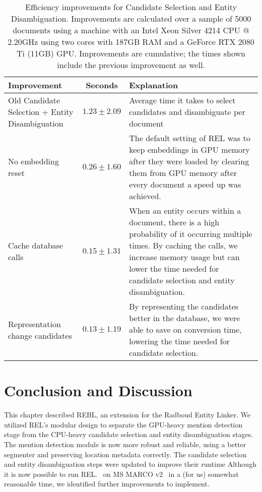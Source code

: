 \begin{sidewaystable}
	\caption{Efficiency improvements for Candidate Selection and Entity Disambiguation. Improvements are calculated over a sample of 5000 documents using a machine with an Intel Xeon Silver 4214 CPU @ 2.20GHz using two cores with 187GB RAM and a GeForce RTX 2080 Ti (11GB) GPU. Improvements are cumulative; the times shown include the previous improvement as well.}
	\label{tab:efficiency}
	\begin{tabular}{p{6cm} c p{10cm}}
		\toprule
		Improvement & Seconds & Explanation\\
		\midrule
		Old Candidate Selection + Entity Disambiguation & $1.23 \pm 2.09$ & Average time it takes to select candidates and disambiguate per document\\
		\midrule
		No embedding reset & $0.26 \pm 1.60$ & The default setting of REL was to keep embeddings in GPU memory after they were loaded by clearing them from GPU memory after every document a speed up was achieved.\\
		Cache database calls & $0.15 \pm 1.31$ & When an entity occurs within a document, there is a high probability of it occurring multiple times. By caching the calls, we increase memory usage but can lower the time needed for candidate selection and entity disambiguation.  \\
		Representation change candidates & $0.13 \pm 1.19$ & By representing the candidates better in the database, we were able to save on conversion time, lowering the time needed for candidate selection.\\
		\bottomrule
	\end{tabular}
\end{sidewaystable}

\section{Conclusion and Discussion}
This chapter described REBL, an extension for the Radboud Entity Linker. We utilized REL's modular design to separate the GPU-heavy mention detection stage from the CPU-heavy candidate selection and entity disambiguation stages. The mention detection module is now more robust and reliable, using a better segmenter and preserving location metadata correctly.
The candidate selection and entity disambiguation steps were updated to improve their runtime Although it is now possible to run REL.~\citep{rel} on MS MARCO v2~\citep{msmarco} in a (for us) somewhat reasonable time, we identified further improvements to implement.

